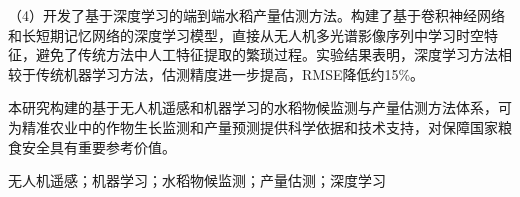 （4）开发了基于深度学习的端到端水稻产量估测方法。构建了基于卷积神经网络和长短期记忆网络的深度学习模型，直接从无人机多光谱影像序列中学习时空特征，避免了传统方法中人工特征提取的繁琐过程。实验结果表明，深度学习方法相较于传统机器学习方法，估测精度进一步提高，RMSE降低约15\%。

本研究构建的基于无人机遥感和机器学习的水稻物候监测与产量估测方法体系，可为精准农业中的作物生长监测和产量预测提供科学依据和技术支持，对保障国家粮食安全具有重要参考价值。

\vspace{0.5cm}

%
{\songti 无人机遥感；机器学习；水稻物候监测；产量估测；深度学习}

\clearpage
